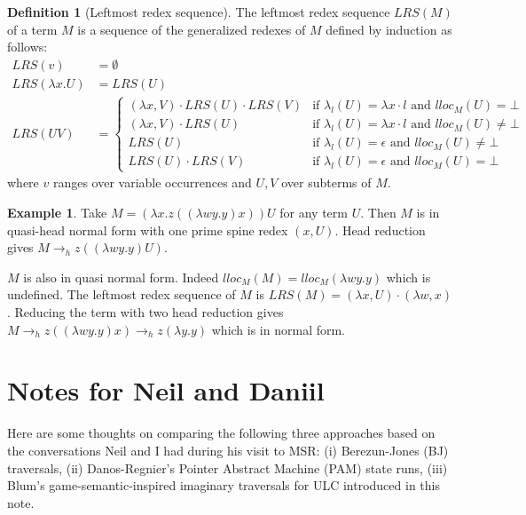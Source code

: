 \documentclass{article}
\theoremstyle{definition}
\newtheorem{definition}{Definition}[section]
\newtheorem{example}{Example}[section]
\begin{document}
\begin{definition}[Leftmost redex sequence]
The leftmost redex sequence $LRS(M)$ of a term $M$ is a sequence of the generalized redexes of $M$ defined by induction as follows:
\begin{align*}
LRS(v) &= \emptyset \\
LRS(\lambda x . U) &= LRS(U)\\
LRS(U V) &=
    \begin{cases}
        (\lambda x, V) \cdot LRS(U) \cdot LRS(V) & \mbox{if $\lambda_l(U) = \lambda x \cdot l$ and $lloc_M(U) =\bot$ } \\
        (\lambda x, V) \cdot  LRS(U) & \mbox{if $\lambda_l(U) = \lambda x \cdot l $ and $lloc_M(U) \neq \bot$} \\
        LRS(U) & \mbox{if $\lambda_l(U) = \epsilon$ and $lloc_M(U) \neq \bot$} \\
        LRS(U) \cdot LRS(V) & \mbox{if $\lambda_l(U) = \epsilon$ and $lloc_M(U) = \bot$}
    \end{cases}
\end{align*}
where $v$ ranges over variable occurrences and $U,V$ over subterms of $M$.
\end{definition}

\begin{example}
Take $M = (\lambda x . z ((\lambda w y . y)x)) U$ for any term $U$.
Then $M$ is in quasi-head normal form with one prime spine redex $(x,U)$.
Head reduction gives $M \rightarrow_h z ((\lambda w y. y) U)$.

$M$ is also in quasi normal form. Indeed $lloc_M(M) = lloc_M (\lambda w y . y)$ which is undefined.
The leftmost redex sequence of $M$ is $LRS(M) = (\lambda x, U) \cdot (\lambda w, x)$.
Reducing the term with two head reduction gives
$M \rightarrow_h z ((\lambda w y.y)x) \rightarrow_h z (\lambda y . y)$ which is in normal form.
\end{example}

\appendix

\section{Notes for Neil and Daniil}

Here are some thoughts on comparing the following three approaches
based on the conversations Neil and I had during his visit to MSR:
(i) Berezun-Jones (BJ) traversals,
(ii) Danos-Regnier's Pointer Abstract Machine (PAM) state runs,
(iii) Blum's game-semantic-inspired imaginary traversals for ULC introduced in this note.
\end{document}

